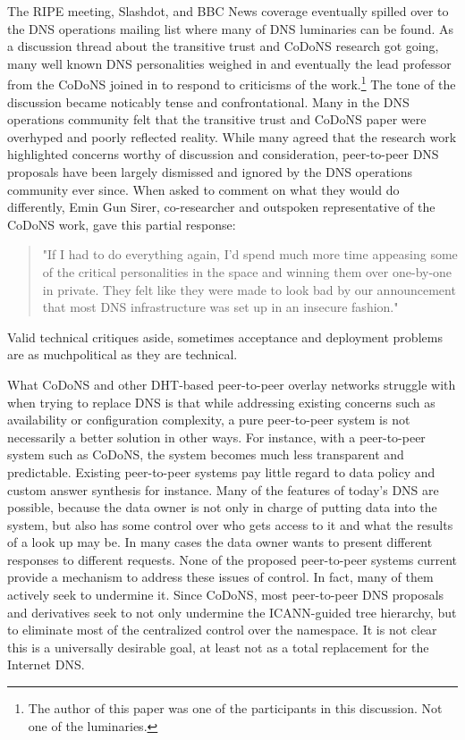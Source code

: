 \documentclass[sigconf]{acmart}
\begin{document}
The RIPE meeting, Slashdot, and BBC News coverage eventually spilled
over to the DNS operations mailing list where many of DNS luminaries can
be found.  As a discussion thread about the transitive trust and CoDoNS
research got going, many well known DNS personalities weighed in and
eventually the lead professor from the CoDoNS joined in to respond to
criticisms of the work.\cite{various_dns-operations_2006}\footnote{The
author of this paper was one of the participants in this discussion.
Not one of the luminaries.}  The tone of the discussion became noticably
tense and confrontational.  Many in the DNS operations community felt
that the transitive trust and CoDoNS paper were overhyped and poorly
reflected reality.  While many agreed that the research work highlighted
concerns worthy of discussion and consideration, peer-to-peer DNS
proposals have been largely dismissed and ignored by the DNS operations
community ever since.  When asked to comment on what they would do
differently, Emin Gun Sirer, co-researcher and outspoken representative
of the CoDoNS work, gave this partial response:

\begin{quote}
"If I had to do everything again, I'd spend much more time appeasing some
of the critical personalities in the space and winning them over one-by-one
in private. They felt like they were made to look bad by our announcement
that most DNS infrastructure was set up in an insecure
fashion."\cite{gun_sirer_codons_2017}

\end{quote}

Valid technical critiques aside, sometimes acceptance and deployment
problems are as muchpolitical as they are technical.

What CoDoNS and other DHT-based peer-to-peer overlay networks struggle
with when trying to replace DNS is that while addressing existing
concerns such as availability or configuration complexity, a pure
peer-to-peer system is not necessarily a better solution in other ways.
For instance, with a peer-to-peer system such as CoDoNS, the system
becomes much less transparent and predictable.  Existing peer-to-peer
systems pay little regard to data policy and custom answer synthesis for
instance.  Many of the features of today's DNS are possible, because the
data owner is not only in charge of putting data into the system, but
also has some control over who gets access to it and what the results of
a look up may be.  In many cases the data owner wants to present
different responses to different requests.  None of the proposed
peer-to-peer systems current provide a mechanism to address these issues
of control.  In fact, many of them actively seek to undermine it.  Since
CoDoNS, most peer-to-peer DNS proposals and derivatives seek to not only
undermine the ICANN-guided tree hierarchy, but to eliminate most of the
centralized control over the namespace.  It is not clear this is a
universally desirable goal, at least not as a total replacement for the
Internet DNS.
\end{document}
